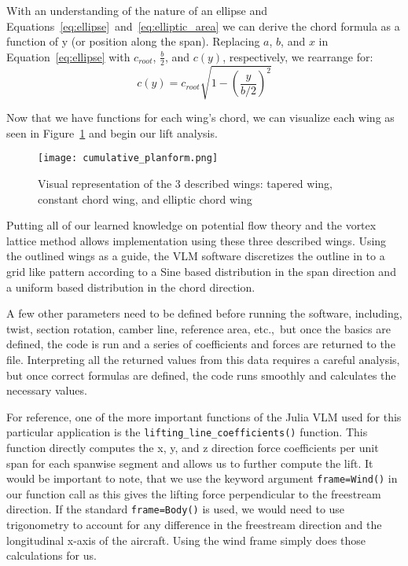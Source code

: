 \documentclass{article}
\begin{document}
With an understanding of the nature of an ellipse and Equations~\ref{eq:ellipse}~and~\ref{eq:elliptic_area} we can derive the chord formula as a function of y (or position along the span).
Replacing $a$, $b$, and $x$ in Equation~\ref{eq:ellipse} with $c_{root}$, $\frac{b}{2}$, and $c(y)$, respectively, we rearrange for:
\begin{equation}\label{chord_formula}
c(y) = c_{root} \sqrt{1 - {\left(\frac{y}{b/2}\right)}^2}
\end{equation}

Now that we have functions for each wing's chord, we can visualize each wing as seen in Figure~\ref{fig:cumulative_planform} and begin our lift analysis.

\begin{figure}[H]
    \centering
    \texttt{[image: cumulative\_planform.png]}
    \caption{Visual representation of the 3 described wings: tapered wing, constant chord wing, and elliptic chord wing}\label{fig:cumulative_planform}
\end{figure}

Putting all of our learned knowledge on potential flow theory and the vortex lattice method allows implementation using these three described wings.
Using the outlined wings as a guide, the VLM software discretizes the outline in to a grid like pattern according to a Sine based distribution in the span direction and a uniform based distribution in the chord direction.

A few other parameters need to be defined before running the software, including, twist, section rotation, camber line, reference area, etc.,\ but once the basics are defined, the code is run and a series of coefficients and forces are returned to the file.
Interpreting all the returned values from this data requires a careful analysis, but once correct formulas are defined, the code runs smoothly and calculates the necessary values.

For reference, one of the more important functions of the Julia VLM used for this particular application is the \texttt{lifting\_line\_coefficients()} function. %
This function directly computes the x, y, and z direction force coefficients per unit span for each spanwise segment and allows us to further compute the lift.
It would be important to note, that we use the keyword argument \texttt{frame=Wind()} in our function call as this gives the lifting force perpendicular to the freestream direction. If the standard \texttt{frame=Body()} is used, we would need to use trigonometry to account for any difference in the freestream direction and the longitudinal x-axis of the aircraft. %
Using the wind frame simply does those calculations for us.
\end{document}
